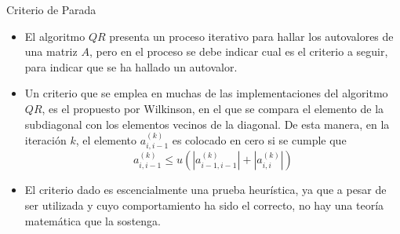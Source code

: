 \documentclass[11pt]{beamer}
\begin{document}
\begin{frame}{Criterio de Parada}
\begin{itemize}
   \item<1-> El algoritmo $QR$ presenta un proceso iterativo para hallar los autovalores de una 
matriz $A$, pero 
en el proceso se debe indicar cual es el criterio a seguir, para indicar que se ha hallado un 
autovalor.
\item<2-> Un criterio que se emplea en muchas de las implementaciones del algoritmo $QR$, es el propuesto por Wilkinson, en el que se compara el elemento de la subdiagonal con los elementos vecinos de la diagonal. De esta manera, en la iteraci\'on $k$, el elemento $a^{(k)}_{i,i-1}$ es
colocado en cero si se cumple que
$$
a^{(k)}_{i,i-1} \leq u\left(|a^{(k)}_{i-1,i-1}|+|a^{(k)}_{i,i}|\right)
$$
\item<3-> El criterio dado es escencialmente una prueba heur\'istica, ya que a pesar
de ser utilizada y cuyo comportamiento ha sido el correcto, no hay una teor\'ia matem\'atica
que la sostenga.
\end{itemize}
\end{frame}
\end{document}
